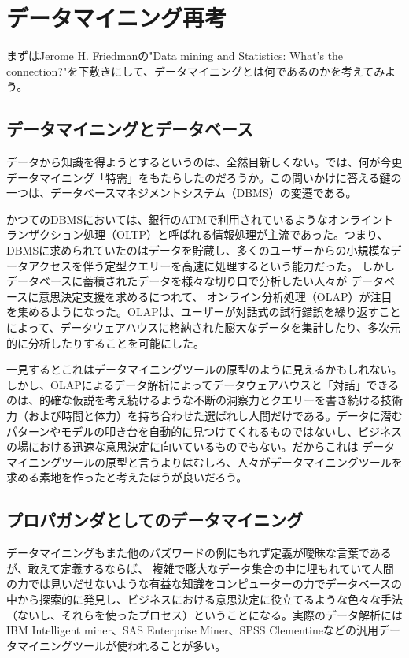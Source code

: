 \section{データマイニング再考}
まずはJerome H. Friedmanの"Data mining and Statistics: What's the connection?"を下敷きにして、データマイニングとは何であるのかを考えてみよう。

\subsection{データマイニングとデータベース}
データから知識を得ようとするというのは、全然目新しくない。では、何が今更データマイニング「特需」をもたらしたのだろうか。この問いかけに答える鍵の一つは、データベースマネジメントシステム（DBMS）の変遷である。

かつてのDBMSにおいては、銀行のATMで利用されているようなオンライントランザクション処理（OLTP）と呼ばれる情報処理が主流であった。つまり、DBMSに求められていたのはデータを貯蔵し、多くのユーザーからの小規模なデータアクセスを伴う定型クエリーを高速に処理するという能力だった。
しかしデータベースに蓄積されたデータを様々な切り口で分析したい人々が
データベースに意思決定支援を求めるにつれて、
オンライン分析処理（OLAP）が注目を集めるようになった。OLAPは、ユーザーが対話式の試行錯誤を繰り返すことによって、データウェアハウスに格納された膨大なデータを集計したり、多次元的に分析したりすることを可能にした。

一見するとこれはデータマイニングツールの原型のように見えるかもしれない。しかし、OLAPによるデータ解析によってデータウェアハウスと「対話」できるのは、的確な仮説を考え続けるような不断の洞察力とクエリーを書き続ける技術力（および時間と体力）を持ち合わせた選ばれし人間だけである。データに潜むパターンやモデルの叩き台を自動的に見つけてくれるものではないし、ビジネスの場における迅速な意思決定に向いているものでもない。だからこれは
データマイニングツールの原型と言うよりはむしろ、人々がデータマイニングツールを求める素地を作ったと考えたほうが良いだろう。

\subsection{プロパガンダとしてのデータマイニング}
データマイニングもまた他のバズワードの例にもれず定義が曖昧な言葉であるが、敢えて定義するならば、
複雑で膨大なデータ集合の中に埋もれていて人間の力では見いだせないような有益な知識をコンピューターの力でデータベースの中から探索的に発見し、ビジネスにおける意思決定に役立てるような色々な手法（ないし、それらを使ったプロセス）ということになる。実際のデータ解析にはIBM Intelligent miner、SAS Enterprise Miner、SPSS Clementineなどの汎用データマイニングツールが使われることが多い。

